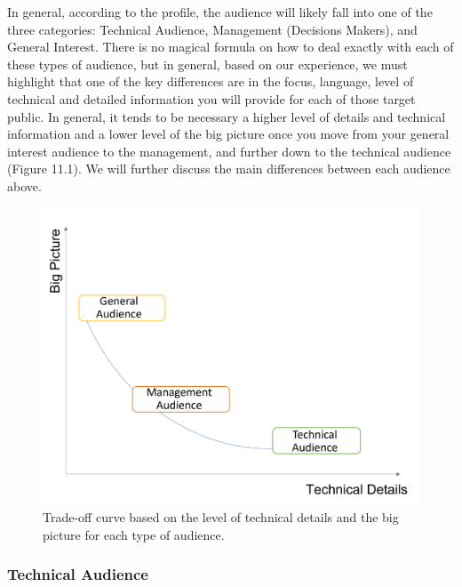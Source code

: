\documentclass[
]{book}
\begin{document}
In general, according to the profile, the audience will likely fall into one of the three categories: Technical Audience, Management (Decisions Makers), and General Interest. There is no magical formula on how to deal exactly with each of these types of audience, but in general, based on our experience, we must highlight that one of the key differences are in the focus, language, level of technical and detailed information you will provide for each of those target public. In general, it tends to be necessary a higher level of details and technical information and a lower level of the big picture once you move from your general interest audience to the management, and further down to the technical audience (Figure 11.1). We will further discuss the main differences between each audience above.

\begin{figure}

{\centering \includegraphics[width=13.08in]{images/trade-off_value_delivery} 

}

\caption{Trade-off curve based on the level of technical details and the big picture for each type of audience.}\label{fig:trade-off}
\end{figure}

\hypertarget{technical-audience}{%
\subsubsection{Technical Audience}\label{technical-audience}}
\end{document}
